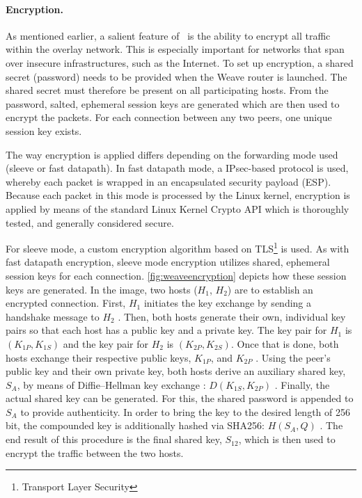 \paragraph{Encryption.} 
As mentioned earlier, a salient feature of \wnet\ is the ability to encrypt all traffic within the overlay network. This is especially important for networks that span over insecure infrastructures, such as the Internet. To set up encryption, a shared secret (password) needs to be provided when the Weave router is launched. The shared secret must therefore be present on all participating hosts. From the password, salted, ephemeral session keys are generated which are then used to encrypt the packets. For each connection between any two peers, one unique session key exists.

The way encryption is applied differs depending on the forwarding mode used (sleeve or fast datapath). In fast datapath mode, a IPsec-based protocol is used, whereby each packet is wrapped in an encapsulated security payload (ESP). Because each packet in this mode is processed by the Linux kernel, encryption is applied by means of the standard Linux Kernel Crypto API which is thoroughly tested, and generally considered secure.

For sleeve mode, a custom encryption algorithm based on TLS\footnote{Transport Layer Security} is used. As with fast datapath encryption, sleeve mode encryption utilizes shared, ephemeral session keys for each connection. \autoref{fig:weaveencryption} depicts how these session keys are generated. In the image, two hosts ($H_1$, $H_2$) are to establish an encrypted connection. First, $H_1$ initiates the key exchange by sending a handshake message to $H_2$ . Then, both hosts generate their own, individual key pairs so that each host has a public key and a private key. The key pair for $H_1$ is $(K_{1P}, K_{1S})$ and the key pair for $H_2$ is $(K_{2P}, K_{2S})$. Once that is done, both hosts exchange their respective public keys, $K_{1P}$, and $K_{2P}$ . Using the peer's public key and their own private key, both hosts derive an auxiliary shared key, $S_A$, by means of Diffie--Hellman key exchange \cite{bresson2001provably}: $D(K_{1S},K_{2P})$ . Finally, the actual shared key can be generated. For this, the shared password is appended to $S_A$ to provide authenticity. In order to bring the key to the desired length of 256 bit, the compounded key is additionally hashed via SHA256: $H(S_A, Q)$ . The end result of this procedure is the final shared key, $S_{12}$, which is then used to encrypt the traffic between the two hosts.

